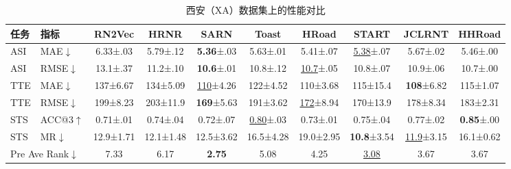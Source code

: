 \begin{table}[H]
    \centering
    \caption{西安（XA）数据集上的性能对比}
    \label{tab:HHRoad_xa}
    \small
    \setlength{\tabcolsep}{3pt}
    \begin{tabular}{ll|cccccccc}
        \hline
        \textbf{任务} & \textbf{指标} & \textbf{RN2Vec} & \textbf{HRNR} & \textbf{SARN} & \textbf{Toast} & \textbf{HRoad} & \textbf{START} & \textbf{JCLRNT} & \textbf{HHRoad} \\
        \hline
        ASI & MAE$\downarrow$ & 6.33\tiny{±.03} & 5.79\tiny{±.12} & \textbf{5.36}\tiny{±.03} & 5.63\tiny{±.01} & 5.41\tiny{±.07} & \underline{5.38}\tiny{±.07} & 5.67\tiny{±.02} & 5.46\tiny{±.00} \\
        ASI & RMSE$\downarrow$ & 13.1\tiny{±.37} & 11.2\tiny{±.10} & \textbf{10.6}\tiny{±.01} & 10.8\tiny{±.12} & \underline{10.7}\tiny{±.05} & 10.8\tiny{±.07} & 10.9\tiny{±.06} & 10.7\tiny{±.00} \\
        TTE & MAE$\downarrow$ & 137\tiny{±6.67} & 134\tiny{±5.09} & \underline{110}\tiny{±4.26} & 122\tiny{±4.52} & 110\tiny{±3.68} & 115\tiny{±15.4} & \textbf{108}\tiny{±6.82} & 115\tiny{±1.07} \\
        TTE & RMSE$\downarrow$ & 199\tiny{±8.23} & 203\tiny{±11.9} & \textbf{169}\tiny{±5.63} & 191\tiny{±3.62} & \underline{172}\tiny{±8.94} & 170\tiny{±13.9} & 178\tiny{±8.34} & 183\tiny{±2.31} \\
        STS & ACC@3$\uparrow$ & 0.71\tiny{±.01} & 0.74\tiny{±.04} & 0.72\tiny{±.07} & \underline{0.80}\tiny{±.03} & 0.73\tiny{±.01} & 0.75\tiny{±.04} & 0.77\tiny{±.02} & \textbf{0.85}\tiny{±.00} \\
        STS & MR$\downarrow$ & 12.9\tiny{±1.71} & 12.1\tiny{±1.48} & 12.5\tiny{±3.62} & 16.5\tiny{±4.28} & 19.0\tiny{±2.95} & \textbf{10.8}\tiny{±3.54} & \underline{11.9}\tiny{±3.15} & 16.1\tiny{±0.62} \\
        \hline
        \multicolumn{2}{l|}{Pre Ave Rank$\downarrow$} & 7.33 & 6.17 & \textbf{2.75} & 5.08 & 4.25 & \underline{3.08} & 3.67 & 3.67 \\
        \hline
    \end{tabular}
\end{table}

